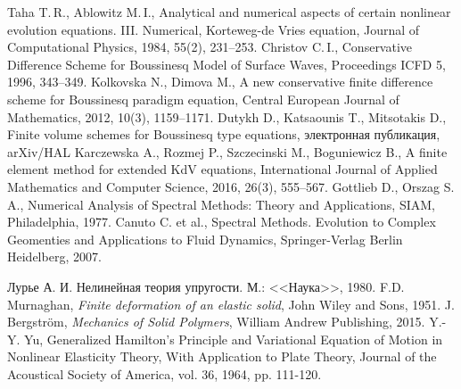 \documentclass[12pt, a4paper]{report}
\begin{document}
\begin{thebibliography}{99}
	 Taha T.\,R., Ablowitz M.\,I., Analytical and numerical aspects of certain nonlinear evolution equations. III. Numerical, Korteweg-de Vries equation, Journal of Computational Physics, 1984, 55(2), 231--253.
	 Christov C.\,I., Conservative Difference Scheme for Boussinesq Model of Surface Waves, Proceedings ICFD 5, 1996, 343--349.
	 Kolkovska N., Dimova M., A new conservative finite difference scheme for Boussinesq paradigm equation, Central European Journal of Mathematics, 2012, 10(3), 1159--1171.
	 Dutykh D., Katsaounis T., Mitsotakis D., Finite volume schemes for Boussinesq type equations, электронная публикация, arXiv/HAL
	 Karczewska A., Rozmej P., Szczecinski M., Boguniewicz B., A finite element method for extended KdV equations, International Journal of Applied Mathematics and Computer Science, 2016, 26(3), 555--567.
	 Gottlieb D., Orszag S.\,A., Numerical Analysis of Spectral Methods: Theory and Applications, SIAM, Philadelphia, 1977.
	 Canuto C. et al., Spectral Methods. Evolution to Complex Geomenties and Applications to Fluid Dynamics, Springer-Verlag Berlin Heidelberg, 2007.
	
	 Лурье А. И. Нелинейная теория упругости. М.: <<Наука>>, 1980.
	 F.D. Murnaghan, \textit{Finite deformation of an elastic solid}, John Wiley and Sons, 1951.
	 J. Bergstr\"{o}m, \textit{Mechanics of Solid Polymers}, William Andrew Publishing, 2015.
	 Y.-Y. Yu, Generalized Hamilton's Principle and Variational Equation of Motion in Nonlinear Elasticity Theory, With Application to Plate Theory, Journal of the Acoustical Society of America, vol. 36, 1964, pp. 111-120.
	

\end{thebibliography}
\end{document}
